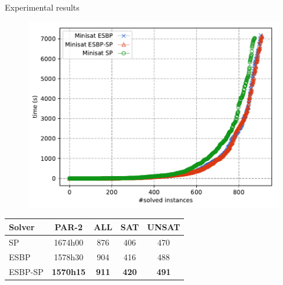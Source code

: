 \documentclass{beamer}
\begin{document}
\begin{frame}{Experimental results}

\begin{figure}[t]
	\centering
	{\includegraphics[scale=0.45]{images/combores}}

\end{figure}
\centering
\begin{tabular}{lcccc}
	Solver & PAR-2 & ALL & SAT & UNSAT\\
	\toprule
	SP & 1674h00 & 876 & 406 & 470 \\
	ESBP & 1578h30 & 904 & 416 & 488\\
	ESBP-SP & \cellcolor{gray!30}\textbf{1570h15} & \cellcolor{gray!30}\textbf{911} & \cellcolor{gray!30}\textbf{420} & \cellcolor{gray!30}\textbf{491}\\
\end{tabular}
\end{frame}
\end{document}
